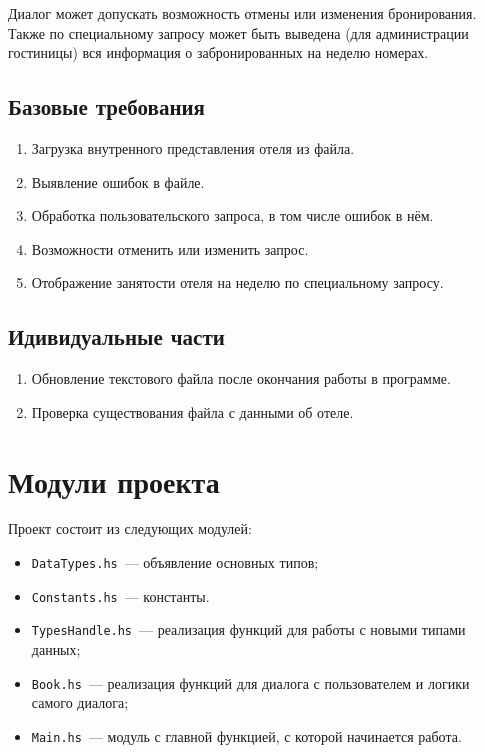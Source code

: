 \documentclass[oneside,final,14pt]{extarticle}
\begin{document}
Диалог может допускать возможность отмены или изменения бронирования. Также по
специальному запросу может быть выведена (для администрации гостиницы) вся
информация о забронированных на неделю номерах.

\subsection{Базовые требования}
    \begin{enumerate}
        \item Загрузка внутренного представления отеля из файла. 
        \item Выявление ошибок в файле.
        \item Обработка пользовательского запроса, в том числе ошибок в нём.
        \item Возможности отменить или изменить запрос.
        \item Отображение занятости отеля на неделю по специальному запросу.
    \end{enumerate}

\subsection{Идивидуальные части}
    \begin{enumerate}
        \item Обновление текстового файла после окончания работы в программе.
        \item Проверка существования файла с данными об отеле.
    \end{enumerate}
\section{Модули проекта}

Проект состоит из следующих модулей:
\begin{itemize}
    \item \texttt{DataTypes.hs}~--- объявление основных типов;
    \item \texttt{Constants.hs}~--- константы.
    \item \texttt{TypesHandle.hs}~--- реализация функций для работы с новыми типами данных;
    \item \texttt{Book.hs}~--- реализация функций для диалога с пользователем и логики самого диалога;
    \item \texttt{Main.hs}~--- модуль с главной функцией, с которой начинается работа.
\end{itemize}
\end{document}
